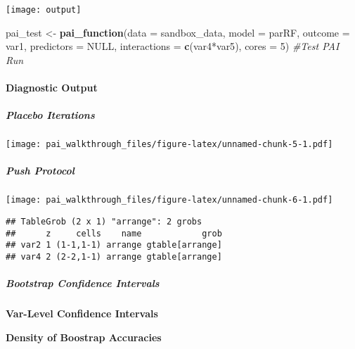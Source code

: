 \documentclass[
]{article}
\newenvironment{Shaded}{\begin{snugshade}}{\end{snugshade}}
\newcommand{\AttributeTok}[1]{\textcolor[rgb]{0.13,0.29,0.53}{#1}}
\newcommand{\CommentTok}[1]{\textcolor[rgb]{0.56,0.35,0.01}{\textit{#1}}}
\newcommand{\ConstantTok}[1]{\textcolor[rgb]{0.56,0.35,0.01}{#1}}
\newcommand{\DecValTok}[1]{\textcolor[rgb]{0.00,0.00,0.81}{#1}}
\newcommand{\FunctionTok}[1]{\textcolor[rgb]{0.13,0.29,0.53}{\textbf{#1}}}
\newcommand{\NormalTok}[1]{#1}
\newcommand{\OtherTok}[1]{\textcolor[rgb]{0.56,0.35,0.01}{#1}}
\newcommand{\StringTok}[1]{\textcolor[rgb]{0.31,0.60,0.02}{#1}}
\begin{document}
\begin{center}\texttt{[image: output]} \end{center}

\begin{Shaded}
\begin{Highlighting}[]
\NormalTok{pai\_test }\OtherTok{\textless{}{-}} \FunctionTok{pai\_function}\NormalTok{(}\AttributeTok{data =}\NormalTok{ sandbox\_data,}
            \AttributeTok{model =} \StringTok{\textquotesingle{}parRF\textquotesingle{}}\NormalTok{,}
            \AttributeTok{outcome =} \StringTok{\textquotesingle{}var1\textquotesingle{}}\NormalTok{,}
            \AttributeTok{predictors =} \ConstantTok{NULL}\NormalTok{,}
            \AttributeTok{interactions =} \FunctionTok{c}\NormalTok{(}\StringTok{\textquotesingle{}var4*var5\textquotesingle{}}\NormalTok{),}
            \AttributeTok{cores =} \DecValTok{5}\NormalTok{) }\CommentTok{\#Test PAI Run}
\end{Highlighting}
\end{Shaded}

\hypertarget{diagnostic-output}{%
\paragraph{\texorpdfstring{\textbf{Diagnostic
Output}}{Diagnostic Output}}\label{diagnostic-output}}

\hypertarget{placebo-iterations}{%
\subparagraph{\texorpdfstring{\textbf{Placebo
Iterations}}{Placebo Iterations}}\label{placebo-iterations}}

\texttt{[image: pai\_walkthrough\_files/figure-latex/unnamed-chunk-5-1.pdf]}

\hypertarget{push-protocol}{%
\subparagraph{\texorpdfstring{\textbf{Push
Protocol}}{Push Protocol}}\label{push-protocol}}

\texttt{[image: pai\_walkthrough\_files/figure-latex/unnamed-chunk-6-1.pdf]}

\begin{verbatim}
## TableGrob (2 x 1) "arrange": 2 grobs
##      z     cells    name            grob
## var2 1 (1-1,1-1) arrange gtable[arrange]
## var4 2 (2-2,1-1) arrange gtable[arrange]
\end{verbatim}

\hypertarget{bootstrap-confidence-intervals}{%
\subparagraph{\texorpdfstring{\textbf{Bootstrap Confidence
Intervals}}{Bootstrap Confidence Intervals}}\label{bootstrap-confidence-intervals}}

\textbf{Var-Level Confidence Intervals}

\textbf{Density of Boostrap Accuracies}
\end{document}
